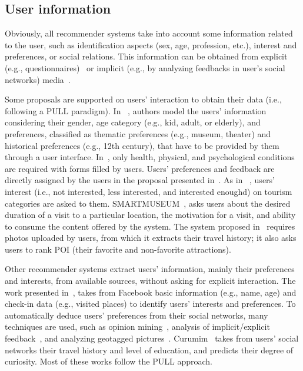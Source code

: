\subsection{User information}
Obviously, all recommender systems take into account some information related to the user, such as identification aspects (sex, age, profession, etc.), interest and preferences, or social relations. This information can be obtained from explicit (e.g., questionnaires)~\cite{jannach2020interactive} or implicit (e.g., by analyzing feedbacks in user's social networks) media~\cite{lin2018hybrid}.  

Some proposals are supported on users' interaction to obtain their data (i.e., following a PULL paradigm). In  %
~\cite{rajaonarivo2019rec}, authors model the users' information considering their gender, age category (e.g., kid, adult, or elderly), and preferences, classified as thematic preferences (e.g., museum, theater) and historical preferences (e.g., 12th century), that have to be provided by them through a user interface.  In~\cite{santos2019using}, only health,  physical, and psychological conditions are required  with forms filled by users. 
Users' preferences and feedback are directly assigned by the users in the proposal presented in~\cite{bahramian_abbaspour_claramunt_2017}. As in ~\cite{arigi2018context}, users' interest (i.e., not interested, less interested, and interested enoughd) on tourism categories are asked to them. SMARTMUSEUM~\cite{ruotsalo2013smartmuseum}, asks users about the desired duration of a visit to a particular location, the motivation for a visit, and ability to consume the content offered by the system. The system proposed in~\cite{shen2016attraction} requires photos uploaded by users, from which it extracts their travel history; it also asks users to rank  POI (their favorite and non-favorite attractions).
 

Other recommender systems extract users' information, mainly their preferences and interests, from available sources,
without asking for explicit interaction.  The work presented in~\cite{kesorn2017personalized}, takes from Facebook basic information (e.g., name, age) and  check-in data (e.g., visited places)  to identify users' interests and preferences. 
To automatically deduce users' preferences from their social networks, many techniques are used, such as opinion mining~\cite{logesh2019exploring,logesh2018personalised}, analysis of implicit/explicit feedback~\cite{hidasi2016general}, and analyzing geotagged pictures~\cite{sun2019building}. 
Curumim~\cite{menk2017curumim} takes from users' social networks their travel history and level of education, and predicts their degree of curiosity. Most of these works follow the PULL approach.


